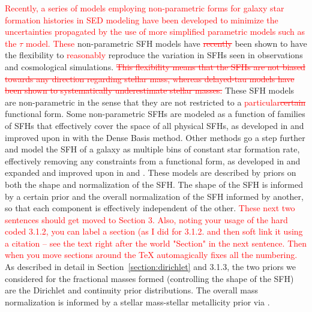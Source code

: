 \documentclass[twocolumn]{aastex62}
\newcommand{\red}[1]{{\textcolor{red}{#1}}}
\begin{document}
\red{Recently, a series of models employing non-parametric forms for galaxy star formation histories in SED modeling have been developed to minimize the uncertainties propagated by the use of more simplified parametric models such as the $\tau$ model.  These} non-parametric SFH models have \red{\sout{recently}} been shown to have the flexibility to \red{reasonably} reproduce the variation in SFHs seen in observations and cosmological simulations. \red{\sout{This flexibility means that the SFHs are not biased towards any direction regarding stellar mass, whereas delayed-tau models have been shown to systematically underestimate stellar masses. }} These SFH models are non-parametric in the sense that they are not restricted to a \red{particular\sout{certain}} functional form. Some non-parametric SFHs are modeled as a function of families of SFHs that effectively cover the space of all physical SFHs, as developed in \cite{iyer_reconstruction_2017} and improved upon in \cite{iyer_non-parametric_2019} with the Dense Basis method. Other methods go a step further and model the SFH of a galaxy as multiple bins of constant star formation rate, effectively removing any constraints from a functional form, as developed in \cite{leja_deriving_2017} and expanded and improved upon in \cite{leja_how_2018} and \cite{leja_older_2019}. These models are described by priors on both the shape and normalization of the SFH. The shape of the SFH is informed by a certain prior and the overall normalization of the SFH informed by another, so that each component is effectively independent of the other. \red{These next two sentences should get moved to Section 3.  Also, noting your usage of the hard coded 3.1.2, you can label a section (as I did for 3.1.2. and then soft link it using a citation -- see the text right after the world "Section" in the next sentence.  Then when you  move sections around the TeX automagically fixes all the numbering. }As described in detail in Section~\ref{section:dirichlet} and 3.1.3, the two priors we considered for the fractional masses formed (controlling the shape of the SFH) are the Dirichlet and continuity prior distributions. The overall mass normalization is informed by a stellar mass-stellar metallicity prior via \cite{gallazzi_ages_2005}.   
\end{document}
